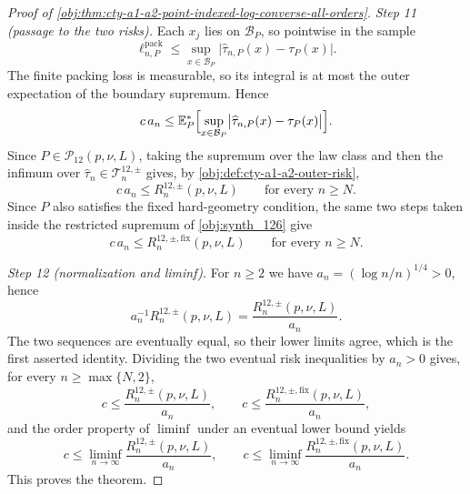 \begin{proof}[Proof of \cref{obj:thm:cty-a1-a2-point-indexed-log-converse-all-orders}]
\emph{Step 11 (passage to the two risks).}
Each \(x_j\) lies on \(\mathcal B_P\), so pointwise in the sample
\[
\ell^{\mathrm{pack}}_{n,P}
\leq
\sup_{x\in\mathcal B_P}\bigl|\widehat\tau_{n,P}(x)-\tau_P(x)\bigr| .
\]
The finite packing loss is measurable, so its integral is at most the outer
expectation of the boundary supremum.  Hence
\[
c\,a_n
\leq
\mathbb E_P^*\Bigl[\sup_{x\in\mathcal B_P}
\bigl|\widehat\tau_{n,P}(x)-\tau_P(x)\bigr|\Bigr].
\]
Since \(P\in\mathcal P_{12}(p,\nu,L)\), taking the supremum over the law class
and then the infimum over \(\widehat\tau_n\in\mathcal T^{12,\pm}_n\) gives, by
\cref{obj:def:cty-a1-a2-outer-risk},
\[
c\,a_n\leq R_n^{12,\pm}(p,\nu,L)
\qquad\text{for every }n\geq N .
\]
Since \(P\) also satisfies the fixed hard-geometry condition, the same two
steps taken inside the restricted supremum of \cref{obj:synth_126} give
\[
c\,a_n\leq R_n^{12,\pm,\mathrm{fix}}(p,\nu,L)
\qquad\text{for every }n\geq N .
\]

\emph{Step 12 (normalization and liminf).}
For \(n\geq2\) we have \(a_n=(\log n/n)^{1/4}>0\), hence
\[
a_n^{-1}R_n^{12,\pm}(p,\nu,L)
=
\frac{R_n^{12,\pm}(p,\nu,L)}{a_n}.
\]
The two sequences are eventually equal, so their lower limits agree, which is
the first asserted identity.
Dividing the two eventual risk inequalities by \(a_n>0\) gives, for every
\(n\geq\max\{N,2\}\),
\[
c\leq\frac{R_n^{12,\pm}(p,\nu,L)}{a_n},
\qquad
c\leq\frac{R_n^{12,\pm,\mathrm{fix}}(p,\nu,L)}{a_n},
\]
and the order property of \(\liminf\) under an eventual lower bound yields
\[
c\leq\liminf_{n\to\infty}\frac{R_n^{12,\pm}(p,\nu,L)}{a_n},
\qquad
c\leq\liminf_{n\to\infty}\frac{R_n^{12,\pm,\mathrm{fix}}(p,\nu,L)}{a_n}.
\]
This proves the theorem. %
\end{proof}

